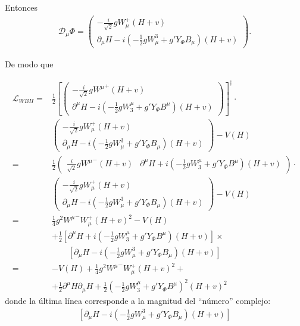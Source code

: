 \begin{frame}
Entonces
\begin{align}
\mathcal{D}_\mu\Phi=\begin{pmatrix}
    -\frac{i}{\sqrt{2}}gW_\mu^+(H+v)\\
    \partial_\mu H-i\left(-\frac{1}{2}gW^3_\mu+g'Y_\Phi B_\mu\right)(H+v)
  \end{pmatrix}.
\end{align}

De modo que

\begin{align}
  \mathcal{L}_{WBH}=&\frac{1}{2}\left[\begin{pmatrix}
    -\frac{i}{\sqrt{2}}g{W^\mu}^+(H+v)\\
    \partial^\mu H-i\left(-\frac{1}{2}gW_3^\mu+g'Y_\Phi B^\mu\right)(H+v)
  \end{pmatrix}\right]^\dagger\cdot\nonumber\\
   &\begin{pmatrix}
    -\frac{i}{\sqrt{2}}gW_\mu^+(H+v)\\
    \partial_\mu H-i\left(-\frac{1}{2}gW^3_\mu+g'Y_\Phi B_\mu\right)(H+v)
  \end{pmatrix}-V(H)\nonumber\\
=&\frac{1}{2}\begin{pmatrix}
    \frac{i}{\sqrt{2}}g{W^\mu}^-(H+v)&
    \partial^\mu H+i\left(-\frac{1}{2}gW_3^\mu+g'Y_\Phi B^\mu\right)(H+v)
  \end{pmatrix}\cdot\nonumber\\
  &\begin{pmatrix}
    -\frac{i}{\sqrt{2}}gW_\mu^+(H+v)\\
    \partial_\mu H-i\left(-\frac{1}{2}gW^3_\mu+g'Y_\Phi B_\mu\right)(H+v)
  \end{pmatrix}-V(H)\nonumber\\
  =&\frac{1}{4}g^2{W^\mu}^-W_\mu^+(H+v)^2-V(H)\nonumber\\
  &+\frac{1}{2}\left[\partial^\mu H+i\left(-\tfrac{1}{2}gW_3^\mu+g'Y_\Phi B^\mu\right)(H+v)\right]
  \times\nonumber\\
  &\qquad\left[\partial_\mu H-i\left(-\tfrac{1}{2}gW^3_\mu+g'Y_\Phi B_\mu\right)(H+v)\right]\nonumber\\
 =&-V(H)
  +\frac{1}{4}g^2{W^\mu}^-W_\mu^+(H+v)^2+\nonumber\\
  &+\frac{1}{2}\partial^\mu H\partial_\mu H+\frac{1}{2}\left(-\tfrac{1}{2}gW_3^\mu+g'Y_\Phi B^\mu\right)^2(H+v)^2
\end{align}
donde la última línea corresponde a la magnitud del ``número'' complejo: 
\begin{align}
\left[\partial_\mu H-i\left(-\tfrac{1}{2}gW^3_\mu+g'Y_\Phi B_\mu\right)(H+v)\right]
\end{align}

\end{frame}
